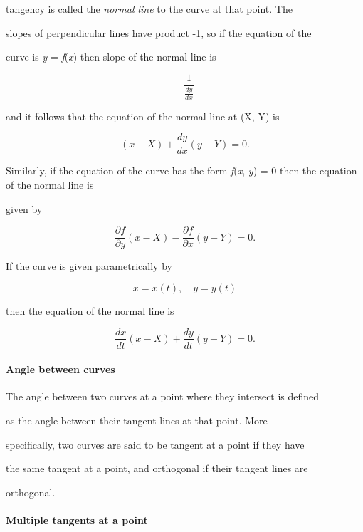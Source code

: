 {{{tangency is called the \textit{normal line} to the curve at that point. The

slopes of perpendicular lines have product -1, so if the equation of the

curve is \textit{y} = \textit{f}(\textit{x}) then slope of the normal line is



$$-\frac{1}{\frac{dy}{dx}}$$ 



and it follows that the equation of the normal line at (X, Y) is



$$(x-X)+\frac{dy}{dx}(y-Y)=0.$$ 



Similarly, if the equation of the curve has the form \textit{f}(\textit{x}, \textit{y}) = 0 then the equation of the normal line is

given by



$$\frac{\partial f}{\partial y}(x-X)-\frac{\partial f}{\partial x}(y-Y)=0.$$



If the curve is given parametrically by



$$x=x(t),\quad y=y(t)$$ 



then the equation of the normal line is



$$\frac{dx}{dt}(x-X)+\frac{dy}{dt}(y-Y)=0.$$



\paragraph{Angle between curves}



The angle between two curves at a point where they intersect is defined

as the angle between their tangent lines at that point. More

specifically, two curves are said to be tangent at a point if they have

the same tangent at a point, and orthogonal if their tangent lines are

orthogonal.



\paragraph{Multiple tangents at a point}



}}}
